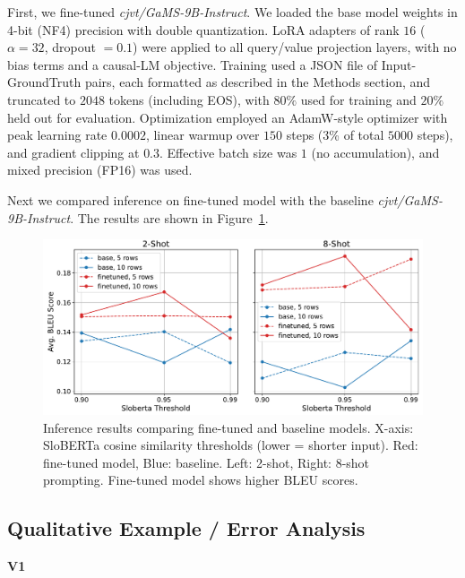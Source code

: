 \documentclass[fleqn,moreauthors,10pt]{ds_report}
\begin{document}
First, we fine-tuned \textit{cjvt/GaMS-9B-Instruct}. We loaded the base model weights in 4-bit (NF4) precision with
double quantization. LoRA adapters of rank $16$ ($\alpha = 32$, dropout $=0.1$) were applied to all query/value
projection layers, with no bias terms and a causal-LM objective.
Training used a JSON file of Input-GroundTruth pairs, each formatted as described in the Methods section, and
truncated to $2048$ tokens (including EOS), with $80\%$ used for training and $20\%$ held out for evaluation.
Optimization employed an AdamW-style optimizer with peak learning rate $0.0002$, linear warmup over $150$ steps
(3\% of total $5000$ steps), and gradient clipping at $0.3$. Effective batch size was $1$ (no accumulation), and
mixed precision (FP16) was used.

Next we compared inference on fine-tuned model with the baseline \textit{cjvt/GaMS-9B-Instruct}. The results are
shown in Figure~\ref{fig:inf_res}.

\begin{figure}[ht]
    \centering
    \includegraphics[width=\columnwidth]{fig/infer_res.pdf}
    \caption{Inference results comparing fine-tuned and baseline models.
    X-axis: SloBERTa cosine similarity thresholds (lower = shorter input).
    Red: fine-tuned model, Blue: baseline.
    Left: 2-shot, Right: 8-shot prompting.
    Fine-tuned model shows higher BLEU scores.}
    \label{fig:inf_res}
\end{figure}

\subsection{Qualitative Example / Error Analysis}
\label{subsec:qualitative}

\vspace{1em}
\noindent \textbf{V1}
\vspace{0.5em}
\end{document}

